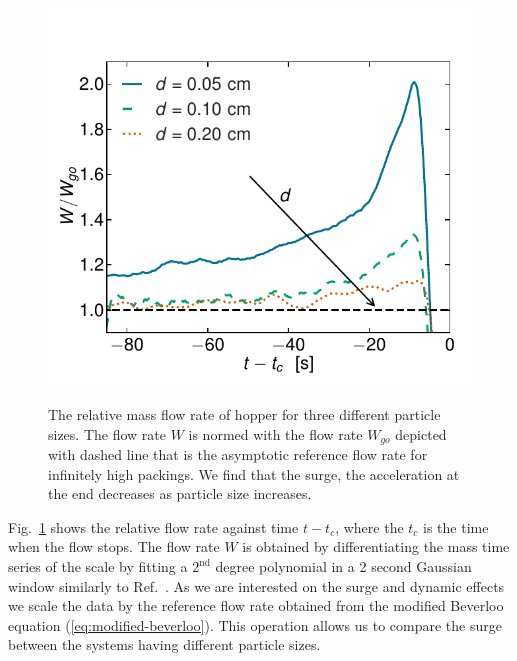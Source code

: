 \documentclass[twoside,twocolumn,9pt]{article}
\begin{document}
\begin{figure}[!t]
\includegraphics[width=\columnwidth]{fig3-surge.pdf}\\
 
\caption{The relative mass flow rate of hopper for three different particle sizes. 
The flow rate $W$ is normed with the flow rate $W_{go}$ depicted with dashed line that is the asymptotic reference flow rate for infinitely high packings. 
We find that the surge, the acceleration at the end decreases as particle size increases.
\label{fig:surge}}
\end{figure}
%
Fig.~\ref{fig:surge} shows the relative flow rate against time 
$t-t_{c}$, where the $t_{c}$ is the time when the flow stops. 
The flow rate $W$ is obtained by differentiating the mass time series of the 
scale by fitting a $2^{\mathrm{nd}}$ degree polynomial in a 2 second 
Gaussian window similarly to Ref.~\cite{koivistoSubmitted}.
As we are interested on the surge and dynamic effects we scale the data by the reference flow rate obtained from the modified Beverloo equation (\ref{eq:modified-beverloo}). 
This operation allows us to compare the surge between the systems having different particle sizes.
\end{document}
